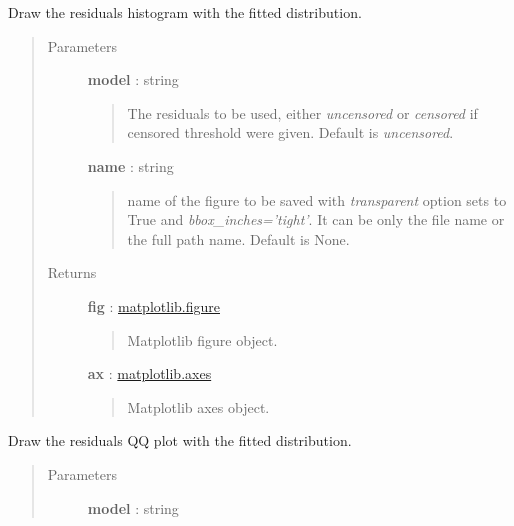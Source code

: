 \documentclass[letterpaper,10pt,english]{sphinxmanual}
\begin{document}
\begin{fulllineitems}
\begin{fulllineitems}
\label{_generated/otpod.UnivariateLinearModelAnalysis:otpod.UnivariateLinearModelAnalysis.drawResidualsDistribution}
Draw the residuals histogram with the fitted distribution.
\begin{quote}\begin{description}
\item[{Parameters}] \leavevmode
\textbf{model} : string
\begin{quote}

The residuals to be used, either \emph{uncensored} or
\emph{censored} if censored threshold were given. Default is \emph{uncensored}.
\end{quote}

\textbf{name} : string
\begin{quote}

name of the figure to be saved with \emph{transparent} option sets to True
and \emph{bbox\_inches='tight'}. It can be only the file name or the 
full path name. Default is None.
\end{quote}

\item[{Returns}] \leavevmode
\textbf{fig} : \href{http://matplotlib.org/api/figure\_api.html}{matplotlib.figure}
\begin{quote}

Matplotlib figure object.
\end{quote}

\textbf{ax} : \href{http://matplotlib.org/api/axes\_api.html}{matplotlib.axes}
\begin{quote}

Matplotlib axes object.
\end{quote}

\end{description}\end{quote}

\end{fulllineitems}


\begin{fulllineitems}
\label{_generated/otpod.UnivariateLinearModelAnalysis:otpod.UnivariateLinearModelAnalysis.drawResidualsQQplot}
Draw the residuals QQ plot with the fitted distribution.
\begin{quote}\begin{description}
\item[{Parameters}] \leavevmode
\textbf{model} : string
\begin{quote}


\end{quote}
\end{description}
\end{quote}
\end{fulllineitems}
\end{fulllineitems}
\end{document}
